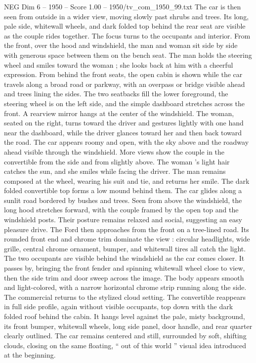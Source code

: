 \begin{textsample}{NEG Dim 6 – 1950 – Score 1.00 – 1950/tv\_com\_1950\_99.txt}
The car is then seen from outside in a wider view, moving slowly past shrubs and trees.
Its long, pale side, whitewall wheels, and dark folded top behind the rear seat are visible as the couple rides together.
The focus turns to the occupants and interior.
From the front, over the hood and windshield, the man and woman sit side by side with generous space between them on the bench seat.
The man holds the steering wheel and smiles toward the woman ; she looks back at him with a cheerful expression.
From behind the front seats, the open cabin is shown while the car travels along a broad road or parkway, with an overpass or bridge visible ahead and trees lining the sides.
The two seatbacks fill the lower foreground, the steering wheel is on the left side, and the simple dashboard stretches across the front.
A rearview mirror hangs at the center of the windshield.
The woman, seated on the right, turns toward the driver and gestures lightly with one hand near the dashboard, while the driver glances toward her and then back toward the road.
The car appears roomy and open, with the sky above and the roadway ahead visible through the windshield.
More views show the couple in the convertible from the side and from slightly above.
The woman ’s light hair catches the sun, and she smiles while facing the driver.
The man remains composed at the wheel, wearing his suit and tie, and returns her smile.
The dark folded convertible top forms a low mound behind them.
The car glides along a sunlit road bordered by bushes and trees.
Seen from above the windshield, the long hood stretches forward, with the couple framed by the open top and the windshield posts.
Their posture remains relaxed and social, suggesting an easy pleasure drive.
The Ford then approaches from the front on a tree-lined road.
Its rounded front end and chrome trim dominate the view : circular headlights, wide grille, central chrome ornament, bumper, and whitewall tires all catch the light.
The two occupants are visible behind the windshield as the car comes closer.
It passes by, bringing the front fender and spinning whitewall wheel close to view, then the side trim and door sweep across the image.
The body appears smooth and light-colored, with a narrow horizontal chrome strip running along the side.
The commercial returns to the stylized cloud setting.
The convertible reappears in full side profile, again without visible occupants, top down with the dark folded roof behind the cabin.
It hangs level against the pale, misty background, its front bumper, whitewall wheels, long side panel, door handle, and rear quarter clearly outlined.
The car remains centered and still, surrounded by soft, shifting clouds, closing on the same floating, “ out of this world ” visual idea introduced at the beginning.

\end{textsample}

